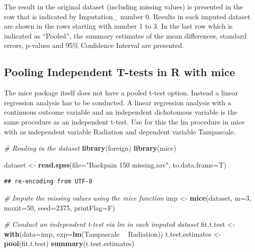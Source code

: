 \documentclass[]{book}
\newenvironment{Shaded}{\begin{snugshade}}{\end{snugshade}}
\newcommand{\KeywordTok}[1]{\textcolor[rgb]{0.13,0.29,0.53}{\textbf{#1}}}
\newcommand{\DataTypeTok}[1]{\textcolor[rgb]{0.13,0.29,0.53}{#1}}
\newcommand{\DecValTok}[1]{\textcolor[rgb]{0.00,0.00,0.81}{#1}}
\newcommand{\StringTok}[1]{\textcolor[rgb]{0.31,0.60,0.02}{#1}}
\newcommand{\CommentTok}[1]{\textcolor[rgb]{0.56,0.35,0.01}{\textit{#1}}}
\newcommand{\OperatorTok}[1]{\textcolor[rgb]{0.81,0.36,0.00}{\textbf{#1}}}
\newcommand{\NormalTok}[1]{#1}
\begin{document}
The result in the original dataset (including missing values) is
presented in the row that is indicated by Imputation\_ number 0. Results
in each imputed dataset are shown in the rows starting with number 1 to
3. In the last row which is indicated as ``Pooled'', the summary
estimates of the mean differences, standard errors, p-values and 95\%
Confidence Interval are presented.

\subsection{Pooling Independent T-tests in R with
mice}\label{pooling-independent-t-tests-in-r-with-mice}

The mice package itself does not have a pooled t-test option. Instead a
linear regression analysis has to be conducted. A linear regression
analysis with a continuous outcome variable and an independent
dichotomous variable is the same procedure as an independent t-test. Use
for this the lm procedure in mice with as independent variable Radiation
and dependent variable Tampascale.

\begin{Shaded}
\begin{Highlighting}[]
\CommentTok{# Reading in the dataset}
\KeywordTok{library}\NormalTok{(foreign)}
\KeywordTok{library}\NormalTok{(mice)}

\NormalTok{dataset <-}\StringTok{ }\KeywordTok{read.spss}\NormalTok{(}\DataTypeTok{file=}\StringTok{"Backpain 150 missing.sav"}\NormalTok{, }\DataTypeTok{to.data.frame=}\NormalTok{T)}
\end{Highlighting}
\end{Shaded}

\begin{verbatim}
## re-encoding from UTF-8
\end{verbatim}

\begin{Shaded}
\begin{Highlighting}[]
\CommentTok{# Impute the missing values using the mice function }
\NormalTok{imp <-}\StringTok{ }\KeywordTok{mice}\NormalTok{(dataset, }\DataTypeTok{m=}\DecValTok{3}\NormalTok{, }\DataTypeTok{maxit=}\DecValTok{50}\NormalTok{, }\DataTypeTok{seed=}\DecValTok{2375}\NormalTok{, }\DataTypeTok{printFlag=}\NormalTok{F)}
 
\CommentTok{# Conduct an independent t-test via lm in each imputed dataset}
\NormalTok{fit.t.test <-}\StringTok{ }\KeywordTok{with}\NormalTok{(}\DataTypeTok{data=}\NormalTok{imp, }\DataTypeTok{exp=}\KeywordTok{lm}\NormalTok{(Tampascale }\OperatorTok{~}\StringTok{ }\NormalTok{Radiation))}
\NormalTok{t.test.estimates <-}\StringTok{ }\KeywordTok{pool}\NormalTok{(fit.t.test)}
\KeywordTok{summary}\NormalTok{(t.test.estimates)}
\end{Highlighting}
\end{Shaded}
\end{document}
